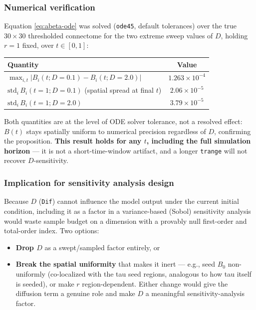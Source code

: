\subsubsection{Numerical verification}

Equation \eqref{eq:abeta-ode} was solved (\texttt{ode45}, default tolerances) over the true $30 \times 30$ thresholded connectome for the two extreme sweep values of $D$, holding $r = 1$ fixed, over $t \in [0, 1]$:

\begin{center}
\begin{tabular}{lc}
\hline
Quantity & Value \\
\hline
$\max_{i,t} \lvert B_i(t; D{=}0.1) - B_i(t; D{=}2.0) \rvert$ & $1.263 \times 10^{-4}$ \\
$\mathrm{std}_i\, B_i(t{=}1; D{=}0.1)$ (spatial spread at final $t$) & $2.06 \times 10^{-5}$ \\
$\mathrm{std}_i\, B_i(t{=}1; D{=}2.0)$ & $3.79 \times 10^{-5}$ \\
\hline
\end{tabular}
\end{center}

Both quantities are at the level of ODE solver tolerance, not a resolved effect: $B(t)$ stays spatially uniform to numerical precision regardless of $D$, confirming the proposition. \textbf{This result holds for any $t$, including the full simulation horizon} --- it is not a short-time-window artifact, and a longer \texttt{trange} will not recover $D$-sensitivity.

\subsubsection{Implication for sensitivity analysis design}

Because $D$ (\texttt{Dif}) cannot influence the model output under the current initial condition, including it as a factor in a variance-based (Sobol) sensitivity analysis would waste sample budget on a dimension with a provably null first-order and total-order index. Two options:
\begin{itemize}
    \item \textbf{Drop $D$} as a swept/sampled factor entirely, or
    \item \textbf{Break the spatial uniformity} that makes it inert --- e.g., seed $B_0$ non-uniformly (co-localized with the tau seed regions, analogous to how tau itself is seeded), or make $r$ region-dependent. Either change would give the diffusion term a genuine role and make $D$ a meaningful sensitivity-analysis factor.
\end{itemize}


